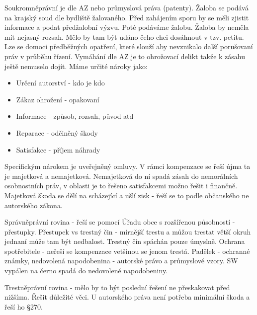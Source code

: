Soukromněprávní je dle AZ nebo průmyslová práva (patenty). Žaloba se podává na krajský soud dle bydliště žalovaného. Před zahájením sporu by se měli zjistit informace a podat předžalobní výzvu. Poté podáváme žalobu. Žaloba by neměla mít nejasný rozsah. Mělo by tam být udáno čeho chci dosáhnout v tzv. petitu. Lze se domoci předběžných opatření, které slouží aby nevznikalo další porušovaní práv v průběhu řízení. Vymáhání dle AZ je to ohrožovací delikt takže k zásahu ještě nemuselo dojít. Máme určité nároky jako:
\begin{itemize}[noitemsep]
    \item  Určení autorství - kdo je kdo
    \item Zákaz ohrožení - opakovaní
    \item Informace - způsob, rozsah, původ atd
    \item Reparace - odčiněný škody
    \item Satisfakce - příjem náhrady
\end{itemize}
Specifickým nárokem je uveřejněný omluvy. V rámci kompenzace se řeší újma ta je majetková a nemajetková. Nemajetková do ní spadá zásah do nemorálních osobnostních práv, v oblasti je to řešeno satisfakcemi možno řešit i finančně. Majetková škoda se dělí na scházející a ušlí zisk - řeší se to podle občanského ne autorského zákona.

Správněprávní rovina - řeší se pomocí Úřadu obce s rozšířenou působností - přestupky. Přestupek vs trestný čin - mírnější trestu a můžou trestat větší okruh jednaní může tam být nedbalost. Trestný čin spáchán pouze úmyslně. Ochrana spotřebitele - neřeší se kompenzace vetšinou se jenom trestá. Padělek - ochranné známky, nedovolená napodobenina - autorské právo a průmyslové vzory. SW vypálen na černo spadá do nedovolené napodobeniny.

Trestněprávní rovina - mělo by to být poslední řešení ne přeskakovat před nižšíma. Řešit důležité věci. U autorského práva není potřeba minimální škoda a řeší ho §270. 


